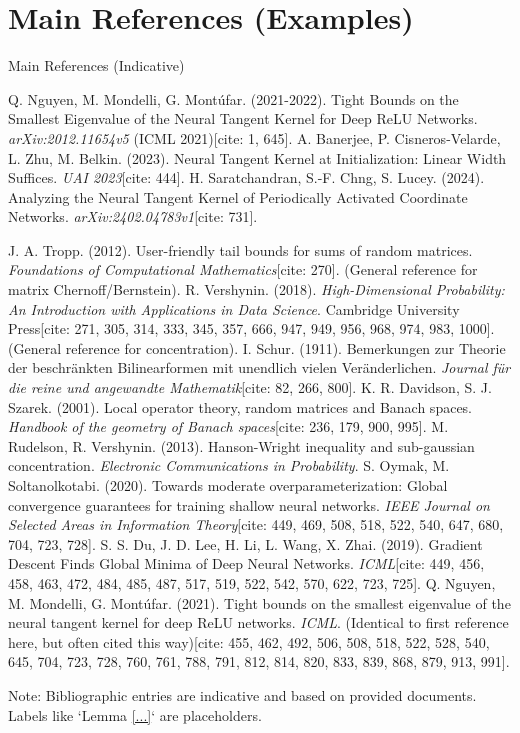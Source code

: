 \documentclass{beamer}
\theoremstyle{definition}
\theoremstyle{remark}
\begin{document}
\section*{Main References (Examples)}
\begin{frame}[allowframebreaks]{Main References (Indicative)}
  \begin{thebibliography}{99}
     Q. Nguyen, M. Mondelli, G. Montúfar. (2021-2022). Tight Bounds on the Smallest Eigenvalue of the Neural Tangent Kernel for Deep ReLU Networks. \textit{arXiv:2012.11654v5} (ICML 2021)[cite: 1, 645].
     A. Banerjee, P. Cisneros-Velarde, L. Zhu, M. Belkin. (2023). Neural Tangent Kernel at Initialization: Linear Width Suffices. \textit{UAI 2023}[cite: 444].
     H. Saratchandran, S.-F. Chng, S. Lucey. (2024). Analyzing the Neural Tangent Kernel of Periodically Activated Coordinate Networks. \textit{arXiv:2402.04783v1}[cite: 731].

     J. A. Tropp. (2012). User-friendly tail bounds for sums of random matrices. \textit{Foundations of Computational Mathematics}[cite: 270]. (General reference for matrix Chernoff/Bernstein).
     R. Vershynin. (2018). \textit{High-Dimensional Probability: An Introduction with Applications in Data Science}. Cambridge University Press[cite: 271, 305, 314, 333, 345, 357, 666, 947, 949, 956, 968, 974, 983, 1000]. (General reference for concentration).
     I. Schur. (1911). Bemerkungen zur Theorie der beschränkten Bilinearformen mit unendlich vielen Veränderlichen. \textit{Journal für die reine und angewandte Mathematik}[cite: 82, 266, 800].
     K. R. Davidson, S. J. Szarek. (2001). Local operator theory, random matrices and Banach spaces. \textit{Handbook of the geometry of Banach spaces}[cite: 236, 179, 900, 995].
     M. Rudelson, R. Vershynin. (2013). Hanson-Wright inequality and sub-gaussian concentration. \textit{Electronic Communications in Probability}.
     S. Oymak, M. Soltanolkotabi. (2020). Towards moderate overparameterization: Global convergence guarantees for training shallow neural networks. \textit{IEEE Journal on Selected Areas in Information Theory}[cite: 449, 469, 508, 518, 522, 540, 647, 680, 704, 723, 728].
     S. S. Du, J. D. Lee, H. Li, L. Wang, X. Zhai. (2019). Gradient Descent Finds Global Minima of Deep Neural Networks. \textit{ICML}[cite: 449, 456, 458, 463, 472, 484, 485, 487, 517, 519, 522, 542, 570, 622, 723, 725].
     Q. Nguyen, M. Mondelli, G. Montúfar. (2021). Tight bounds on the smallest eigenvalue of the neural tangent kernel for deep ReLU networks. \textit{ICML}. (Identical to first reference here, but often cited this way)[cite: 455, 462, 492, 506, 508, 518, 522, 528, 540, 645, 704, 723, 728, 760, 761, 788, 791, 812, 814, 820, 833, 839, 868, 879, 913, 991].

  \end{thebibliography}
  \tiny
  Note: Bibliographic entries are indicative and based on provided documents. Labels like `Lemma \ref{...}` are placeholders.
\end{frame}
\end{document}
